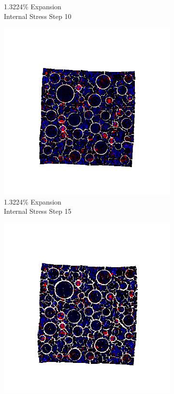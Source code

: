 \begin{figure}[h!]
\begin{subfigure}{.25\textwidth}
      \caption{1.3224\% Expansion\\Internal Stress Step 10}
    \end{subfigure}%
    \begin{subfigure}{.25\textwidth}
      \centering
      \includegraphics[width=1.0\linewidth]{Files/exp_3D/ASR/A30P75_5_s15.png}
      \caption{1.3224\% Expansion\\Internal Stress Step 15}
    \end{subfigure}%
    \begin{subfigure}{.25\textwidth}
      \centering
      \includegraphics[width=1.0\linewidth]{Files/exp_3D/ASR/A30P75_5_stress.png}

\end{subfigure}
\end{figure}

